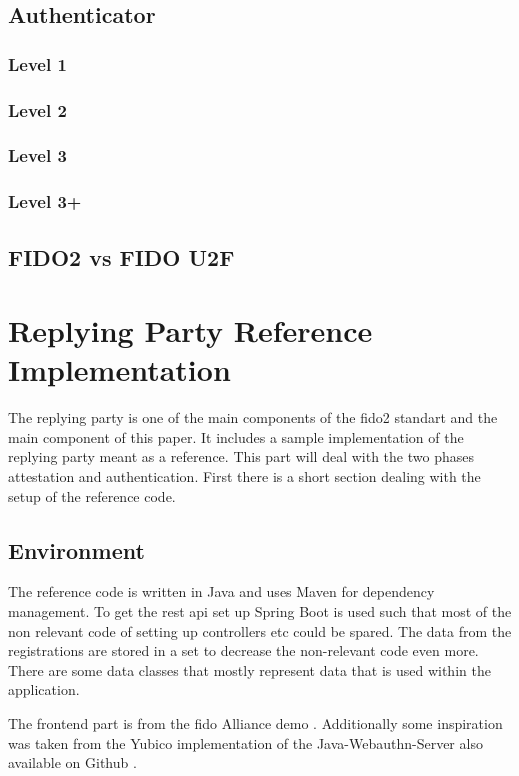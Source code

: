 \documentclass[a4paper, 11pt]{scrartcl}
\begin{document}
\subsection{Authenticator}

\subsubsection{Level 1}
\subsubsection{Level 2}
\subsubsection{Level 3}
\subsubsection{Level 3+}


\subsection{FIDO2 vs FIDO U2F}

\section{Replying Party Reference Implementation}
\label{sec:replying_party}

The replying party is one of the main components of the \gls{fido2} standart and the main component of this paper. It includes a sample implementation of the replying party meant as a reference. This part will deal with the two phases attestation and authentication. First there is a short section dealing with the setup of the reference code.

\subsection{Environment}

The reference code is written in Java and uses Maven for dependency management. To get the \gls{rest} \gls{api} set up Spring Boot is used such that most of the non relevant code of setting up controllers etc could be spared. The data from the registrations are stored in a set to decrease the non-relevant code even more. There are some data classes that mostly represent data that is used within the application. 

The frontend part is from the \gls{fido} Alliance demo \cite{fido:demo}. Additionally some inspiration was taken from the Yubico implementation of the Java-Webauthn-Server also available on Github \cite{yubico:webauthn:server}. 
\end{document}
